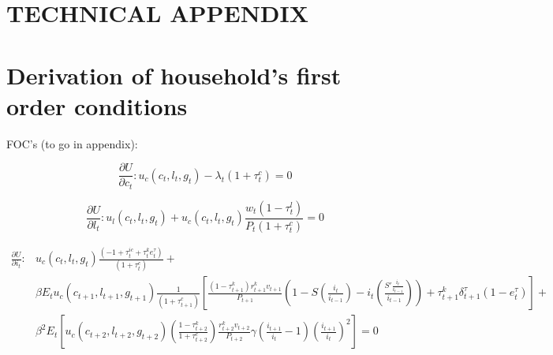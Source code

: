  \renewcommand{\theequation}{T.\arabic{section}.\arabic{equation}}
\renewcommand{\thesection}{T-\arabic{section}}   %
\setcounter{equation}{0}                         %
\setcounter{section}{0}                          %
\section*{TECHNICAL APPENDIX}                    %

\setcounter{equation}{0} %

\section{Derivation of household's first order conditions}\label{TAppHouseholdFOCs}

FOC's (to go in appendix):

\begin{equation}
\frac{\partial U}{\partial c_{t}}: u_{c}(c_{t},l_{t},g_{t})- \lambda_{t}(1+\tau_{t}^{c}) = 0
\end{equation}

\begin{equation}
\frac{\partial U}{\partial l_{t}}: u_{l}(c_{t},l_{t},g_{t})+u_{c}(c_{t},l_{t},g_{t})\frac{w_{t}(1-\tau_{t}^{l})}{P_{t}(1+\tau_{t}^{c})}  = 0
\end{equation}


 \begin{equation}
\begin{split}
\frac{\partial U}{\partial i_{t}}: & u_{c}(c_{t},l_{t},g_{t})\frac{(-1+\tau_{t}^{ic}+\tau_{t}^{k}e_{t}^{\tau})}{(1+\tau_{t}^{c})} + \\
& \beta E_{t}u_{c}(c_{t+1},l_{t+1},g_{t+1})\frac{1}{(1+\tau_{t+1}^{c})}\left[\frac{(1-\tau_{t+1}^{k})r_{t+1}^{k}v_{t+1}}{P_{t+1}}\left(1-S\left(\frac{i_{t}}{i_{t-1}}\right)-i_{t}\left(\frac{S'\frac{i_{t}}{i_{t-1}}}{i_{t-1}}\right)\right)+\tau_{t+1}^{k}\delta_{t+1}^{\tau}(1-e_{t}^{\tau})\right] + \\
&  \beta^{2}E_{t}\left[u_{c}(c_{t+2},l_{t+2},g_{t+2})\left(\frac{1-\tau_{t+2}^{k}}{1+\tau_{t+2}^{c}}\right)\frac{r_{t+2}^{k}v_{t+2}}{P_{t+2}}\gamma\left(\frac{i_{t+1}}{i_{t}}-1\right)\left(\frac{i_{t+1}}{i_{t}}\right)^{2}\right]= 0
  \end{split}
  \end{equation}


